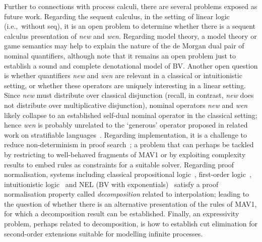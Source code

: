 \documentclass[UKenglish,acmsmall,authorversion]{acmart}
\theoremstyle{plain}
\begin{document}
Further to connections with process calculi, there are several problems exposed as future work.
Regarding the sequent calculus, in the setting of linear logic (i.e.,\ without \textsf{seq}), it is an open problem to determine whether there is a sequent calculus presentation of \textit{new} and \textit{wen}.
Regarding model theory, a model theory or game semantics may help to explain the nature of the de Morgan dual pair of nominal quantifiers, 
although note that it remains an open problem just to establish a sound and complete denotational model of \textsf{BV}.
Another open question is whether quantifiers \textit{new} and \textit{wen} are relevant in a classical or intuitionistic setting, or whether these operators are uniquely interesting in a linear setting.
Since \textit{new} must distribute over classical disjunction (recall, in contrast, \textit{new} does not distribute over multiplicative disjunction), nominal operators \textit{new} and \textit{wen} likely collapse to an established self-dual nominal operator in the classical setting; hence \textit{wen} is probably unrelated to the `generous' operator proposed in related work on stratifiable languages~\cite{Gabbay}.
Regarding implementation, it is a challenge to reduce non-determinism in proof search~\cite{Chaudhuri2011,Ozan2014,Andreoli1992};
a problem that can perhaps be tackled by restricting to well-behaved fragments of \textsf{MAV1} or by exploiting complexity results to embed rules as constraints for a suitable solver. 
Regarding proof normalisation, systems including classical propositional logic~\cite{Tubella2017}, first-order logic~\cite{Tubella2017}, intuitionistic logic~\cite{Guenot2014} and \textsf{NEL} (\textsf{BV} with exponentials)~\cite{Strassburger2011} 
satisfy a proof normalisation property called \textit{decomposition} related to interpolation;
leading to the question of whether there is an alternative presentation of the rules of \textsf{MAV1}, for which a decomposition result can be established. 
Finally, an expressivity problem, perhaps related to decomposition, is how to establish cut elimination for second-order extensions suitable for modelling infinite processes.
\end{document}
